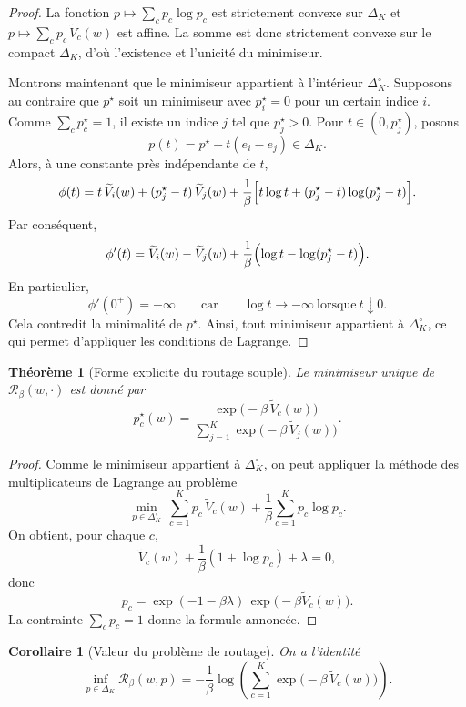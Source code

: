 \documentclass[11pt,a4paper]{article}
\newtheorem{theorem}{Théorème}[section]
\newtheorem{corollary}{Corollaire}[section]
\newcommand{\Rcal}{\mathcal R}
\begin{document}
\begin{proof}
La fonction \(p\mapsto \sum_c p_c\log p_c\) est strictement convexe sur \(\Delta_K\) et \(p\mapsto \sum_c p_c\,\widetilde V_c(w)\) est affine. La somme est donc strictement convexe sur le compact \(\Delta_K\), d'où l'existence et l'unicité du minimiseur.

Montrons maintenant que le minimiseur appartient à l'intérieur \(\Delta_K^\circ\). Supposons au contraire que \(p^\star\) soit un minimiseur avec \(p^\star_i=0\) pour un certain indice \(i\). Comme \(\sum_c p^\star_c=1\), il existe un indice \(j\) tel que \(p^\star_j>0\). Pour \(t\in(0,p^\star_j)\), posons
\[
p(t)=p^\star+t(e_i-e_j)\in\Delta_K.
\]
Alors, à une constante près indépendante de \(t\),
\[
\phi(t)
=
t\,\widetilde V_i(w)
+
(p^\star_j-t)\,\widetilde V_j(w)
+
\frac{1}{\beta}\Bigl[t\log t+(p^\star_j-t)\log(p^\star_j-t)\Bigr].
\]
Par conséquent,
\[
\phi'(t)
=
\widetilde V_i(w)-\widetilde V_j(w)
+
\frac{1}{\beta}\Bigl(\log t-\log(p^\star_j-t)\Bigr).
\]
En particulier,
\[
\phi'(0^+)=-\infty
\qquad\text{car}\qquad
\log t\to-\infty\ \text{lorsque}\ t\downarrow0.
\]
Cela contredit la minimalité de \(p^\star\). Ainsi, tout minimiseur appartient à \(\Delta_K^\circ\), ce qui permet d'appliquer les conditions de Lagrange.
\end{proof}

\begin{theorem}[Forme explicite du routage souple]
Le minimiseur unique de \(\Rcal_\beta(w,\cdot)\) est donné par
\[
p_c^\star(w)
=
\frac{\exp\!\bigl(-\beta\,\widetilde V_c(w)\bigr)}
{\sum_{j=1}^K \exp\!\bigl(-\beta\,\widetilde V_j(w)\bigr)}.
\]
\end{theorem}

\begin{proof}
Comme le minimiseur appartient à \(\Delta_K^\circ\), on peut appliquer la méthode des multiplicateurs de Lagrange au problème
\[
\min_{p\in\Delta_K^\circ}\ \sum_{c=1}^K p_c\,\widetilde V_c(w)+\frac{1}{\beta}\sum_{c=1}^K p_c\log p_c.
\]
On obtient, pour chaque \(c\),
\[
\widetilde V_c(w)+\frac{1}{\beta}(1+\log p_c)+\lambda=0,
\]
donc
\[
p_c=\exp(-1-\beta\lambda)\,\exp\!\bigl(-\beta\widetilde V_c(w)\bigr).
\]
La contrainte \(\sum_c p_c=1\) donne la formule annoncée.
\end{proof}

\begin{corollary}[Valeur du problème de routage]
On a l'identité
\[
\inf_{p\in\Delta_K}\Rcal_\beta(w,p)
=
-\frac{1}{\beta}\log\!\left(\sum_{c=1}^K \exp\!\bigl(-\beta\,\widetilde V_c(w)\bigr)\right).
\]
\end{corollary}
\end{document}
